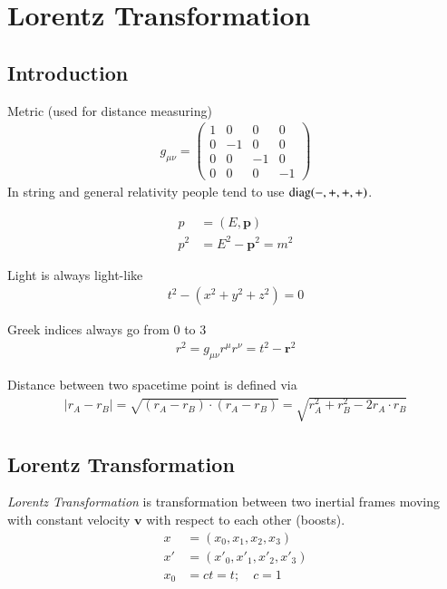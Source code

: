 \chapter{Lorentz Transformation}
\section{Introduction}
Metric (used for distance measuring)
\begin{align}
   g_{\mu\nu} = \begin{pmatrix} 1 & 0 & 0 & 0 \\ 0 & -1 & 0 & 0 \\ 0 & 0 & -1 & 0 \\ 0 & 0 & 0 & -1\end{pmatrix}
\end{align}
In string and general relativity people tend to use $\text{diag}(-, +, +, +)$.

\begin{align}
   p &= (E, \pmb{p}) \\
   p^2 &= E^2 - \pmb{p}^2 = m^2
\end{align}

Light is always light-like
\begin{align*}
   t^2 - (x^2 + y^2 + z^2) = 0
\end{align*}

Greek indices always go from $0$ to $3$
\begin{align}
   r^2 = g_{\mu\nu} r^\mu r^\nu = t^2 - \pmb{r}^2
\end{align}

Distance between two spacetime point is defined via
\begin{align}
   \left| r_A - r_B \right|  = \sqrt{(r_A - r_B)\cdot(r_A - r_B)} = \sqrt{r_A^2 + r_B^2 - 2r_A\cdot r_B}
\end{align}

\section{Lorentz Transformation}
\textit{Lorentz Transformation} is transformation between two inertial frames moving with constant velocity $\pmb{v}$ with respect to each other (boosts).
\begin{align*}
   x &= (x_0, x_1, x_2, x_3) \\
   x' &= (x'_0, x'_1, x'_2, x'_3) \\
   x_0 &= ct = t ;\quad c=1
\end{align*}


